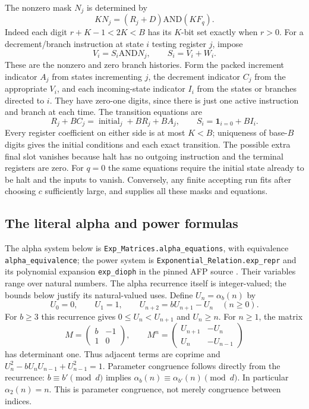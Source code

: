 \documentclass[11pt]{article}
\theoremstyle{definition}
\theoremstyle{remark}
\begin{document}
The nonzero mask $N_j$ is determined by
\[
 K N_j=(R_j+D)\mathbin{\mathrm{AND}}(K F_q).
\]
Indeed each digit $r+K-1<2K<B$ has its $K$-bit set exactly when
$r>0$. For a decrement/branch instruction at state $i$ testing
register $j$, impose
\[
 V_i=S_i\mathbin{\mathrm{AND}}N_j,\qquad S_i=V_i+W_i.
\]
These are the nonzero and zero branch histories. Form the packed
increment indicator $A_j$ from states incrementing $j$, the decrement
indicator $C_j$ from the appropriate $V_i$, and each incoming-state
indicator $I_i$ from the states or branches directed to $i$.
They have zero-one digits, since there is just one active instruction
and branch at each time. The transition equations are
\[
 R_j+BC_j=\operatorname{initial}_j+BR_j+BA_j,\qquad
 S_i=\mathbf1_{i=0}+BI_i.
\]
Every register coefficient on either side is at most $K<B$;
uniqueness of base-$B$ digits gives the initial conditions and each
exact transition. The possible extra final slot vanishes because
halt has no outgoing instruction and the terminal registers are zero.
For $q=0$ the same equations require the initial state already to be
halt and the inputs to vanish. Conversely, any finite accepting run
fits after choosing $c$ sufficiently large, and supplies all these
masks and equations.

\subsection{The literal alpha and power formulas}
The alpha system below is \texttt{Exp\_Matrices.alpha\_equations},
with equivalence \texttt{alpha\_equivalence}; the power system is
\texttt{Exponential\_Relation.exp\_repr} and its polynomial expansion
\texttt{exp\_dioph} in the pinned AFP source \cite{afp}.
Their variables range over natural numbers. The alpha recurrence itself
is integer-valued; the bounds below justify its natural-valued uses.
Define $U_n=\alpha_b(n)$ by
\[
 U_0=0,\qquad U_1=1,\qquad U_{n+2}=bU_{n+1}-U_n\quad(n\ge0).
\]
For $b\ge3$ this recurrence gives
$0\le U_n<U_{n+1}$ and $U_n\ge n$. For $n\ge1$, the matrix
\[
 M=\begin{pmatrix}b&-1\\1&0\end{pmatrix},\qquad
 M^n=\begin{pmatrix}U_{n+1}&-U_n\\U_n&-U_{n-1}\end{pmatrix}
\]
has determinant one. Thus adjacent terms are coprime and
$U_n^2-bU_nU_{n-1}+U_{n-1}^2=1$.
Parameter congruence follows directly from the recurrence:
$b\equiv b'\pmod d$ implies
$\alpha_b(n)\equiv\alpha_{b'}(n)\pmod d$.
In particular $\alpha_2(n)=n$. This is parameter congruence,
not merely congruence between indices.
\end{document}
